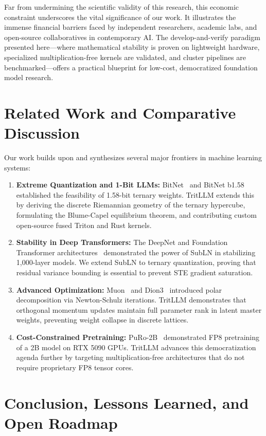 \documentclass[11pt,a4paper]{article}
\begin{document}
Far from undermining the scientific validity of this research, this economic constraint underscores the vital significance of our work. It illustrates the immense financial barriers faced by independent researchers, academic labs, and open-source collaboratives in contemporary AI. The develop-and-verify paradigm presented here---where mathematical stability is proven on lightweight hardware, specialized multiplication-free kernels are validated, and cluster pipelines are benchmarked---offers a practical blueprint for low-cost, democratized foundation model research.

\section{Related Work and Comparative Discussion}

Our work builds upon and synthesizes several major frontiers in machine learning systems:
\begin{enumerate}
    \item \textbf{Extreme Quantization and 1-Bit LLMs:} BitNet~\cite{wang2023bitnet} and BitNet b1.58~\cite{ma2024era} established the feasibility of 1.58-bit ternary weights. TritLLM extends this by deriving the discrete Riemannian geometry of the ternary hypercube, formulating the Blume-Capel equilibrium theorem, and contributing custom open-source fused Triton and Rust kernels.
    \item \textbf{Stability in Deep Transformers:} The DeepNet and Foundation Transformer architectures~\cite{wang2022deepnet} demonstrated the power of SubLN in stabilizing 1,000-layer models. We extend SubLN to ternary quantization, proving that residual variance bounding is essential to prevent STE gradient saturation.
    \item \textbf{Advanced Optimization:} Muon~\cite{jordan2024muon} and Dion3~\cite{amsel2026dion3} introduced polar decomposition via Newton-Schulz iterations. TritLLM demonstrates that orthogonal momentum updates maintain full parameter rank in latent master weights, preventing weight collapse in discrete lattices.
    \item \textbf{Cost-Constrained Pretraining:} PuRo-2B~\cite{luo2026puro} demonstrated FP8 pretraining of a 2B model on RTX 5090 GPUs. TritLLM advances this democratization agenda further by targeting multiplication-free architectures that do not require proprietary FP8 tensor cores.
\end{enumerate}

\section{Conclusion, Lessons Learned, and Open Roadmap}
\end{document}

